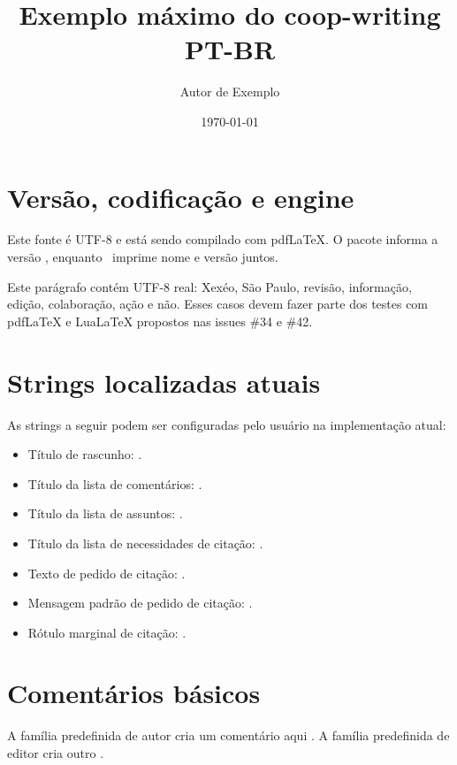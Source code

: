 \documentclass[11pt]{article}
\title{Exemplo máximo do coop-writing\\PT-BR}
\author{Autor de Exemplo}
\date{\today}
\newcommand{\CWEngine}{pdfLaTeX}
\newcommand{\CWEngine}{LuaLaTeX}
\newcommand{\CWEngine}{outro engine TeX}
\begin{document}
\maketitle

\section{Versão, codificação e engine}

Este fonte é UTF-8 e está sendo compilado com \CWEngine.
O pacote informa a versão \coopwritingversion, enquanto
\printcoopwritingversion\ imprime nome e versão juntos.

Este parágrafo contém UTF-8 real: Xexéo, São Paulo, revisão, informação,
edição, colaboração, ação e não. Esses casos devem fazer parte dos testes
com pdfLaTeX e LuaLaTeX propostos nas issues \#34 e \#42.

\section{Strings localizadas atuais}

As strings a seguir podem ser configuradas pelo usuário na implementação atual:

\begin{itemize}
  \item Título de rascunho: \cwdrafttitle.
  \item Título da lista de comentários: \cwcommentstitle.
  \item Título da lista de assuntos: \cwsubjtitle.
  \item Título da lista de necessidades de citação: \cwcitationstitle.
  \item Texto de pedido de citação: \cwpleasecitetext.
  \item Mensagem padrão de pedido de citação: \cwpleasecitemessage.
  \item Rótulo marginal de citação: \cwpleasecitemarginnote.
\end{itemize}

\section{Comentários básicos}

A família predefinida de autor cria um comentário aqui
.
A família predefinida de editor cria outro
.
\end{document}
